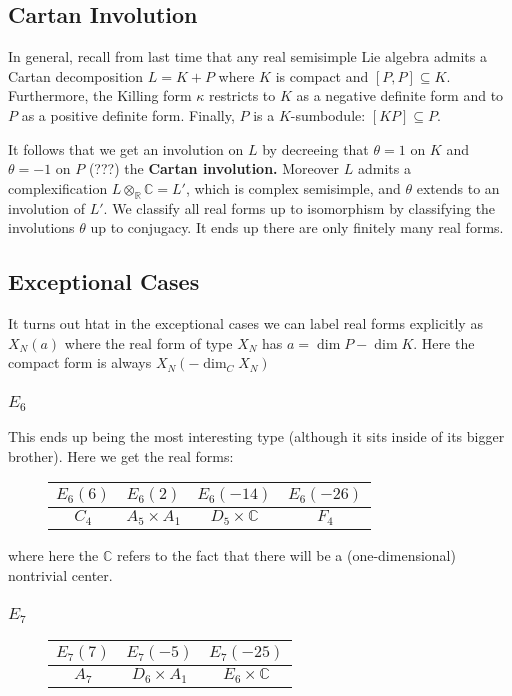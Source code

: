 \documentclass[12pt]{article}
\theoremstyle{nonumberbreak}
\theoremstyle{changebreak}
\theoremstyle{nonumberbreak}
\theoremstyle{change}
\newcommand*{\R}{
\mathbb{R}
}
\newcommand*{\C}{
\mathbb{C}
}
\begin{document}
\subsection{Cartan Involution}
In general, recall from last time that any real semisimple Lie algebra admits a Cartan decomposition
$L=K+P$ where $K$ is compact and $[P,P]\subseteq K$. Furthermore, the Killing form $\kappa$ restricts
to $K$ as a negative definite form and to $P$ as a positive definite form. Finally, $P$ is a $K$-sumbodule:
$[KP]\subseteq P$.

It follows that we get an involution on $L$ by decreeing that $\theta=1$ on $K$ and $\theta=-1$ on $P$ (???) the \textbf{Cartan
involution.} Moreover $L$ admits a complexification $L\otimes_\R\C=L'$, which is complex semisimple, and
$\theta$ extends to an involution of $L'$. We classify all real forms up to isomorphism by classifying the involutions
$\theta$ up to conjugacy. It ends up there are only finitely many real forms.

\subsection{Exceptional Cases}
It turns out htat in the exceptional cases we can label real forms explicitly as $X_N(a)$ where the real form of type $X_N$ has $a=\dim P-\dim K$.
Here the compact form is always $X_N(-\dim_CX_N)$
\subsubsection{$E_6$}
This ends up being the most interesting type (although it sits inside of its bigger brother).
Here we get the real forms:
\begin{figure}[h!]
	\centering
	\begin{tabular}{c|c|c|c}
		$E_6(6)$ & $E_6(2)$ & $E_6(-14)$ & $E_6(-26)$\\\hline
		$C_4$ & $A_5\times A_1$ & $D_5\times \C$ & $F_4$
	\end{tabular}
\end{figure}
where here the $\C$ refers to the fact that there will be a (one-dimensional) nontrivial center.
\subsubsection{$E_7$}
\begin{figure}[h]
	\centering
	\begin{tabular}{c|c|c}
		$E_7(7)$ & $E_7(-5)$ & $E_7(-25)$ \\\hline
		$A_7$ & $D_6\times A_1$ & $E_6\times \C$
	\end{tabular}
\end{figure}
\end{document}
